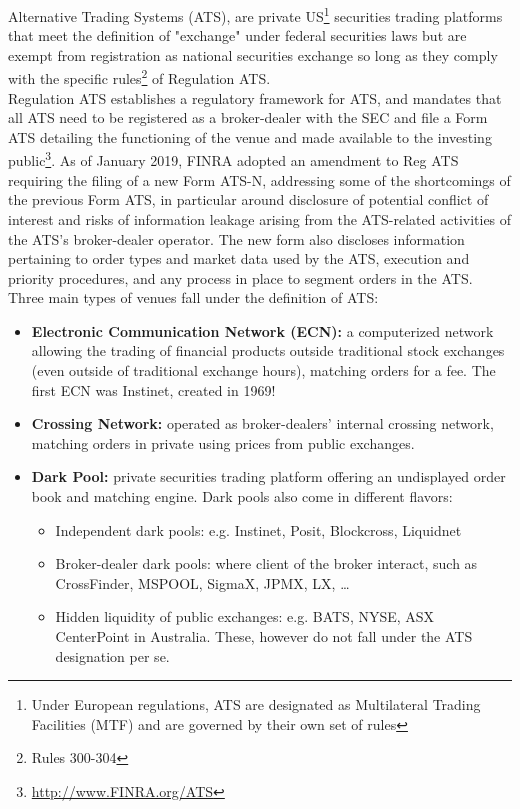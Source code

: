 Alternative Trading Systems (ATS), are private US\footnote{Under European regulations, ATS are designated as Multilateral Trading Facilities (MTF) and are governed by their own set of rules} securities trading platforms that meet the definition of "exchange" under federal securities laws but are exempt from registration as national securities exchange so long as they comply with the specific rules\footnote{Rules 300-304} of Regulation ATS. \\

Regulation ATS establishes a regulatory framework for ATS, and mandates that all ATS need to be registered as a broker-dealer with the SEC and file a Form ATS detailing the functioning of the venue and made available to the investing public\footnote{\url{http://www.FINRA.org/ATS}}. As of January 2019, FINRA adopted an amendment to Reg ATS requiring the filing of a new Form ATS-N, addressing some of the shortcomings of the previous Form ATS, in particular around disclosure of potential conflict of interest and risks of information leakage arising from the ATS-related activities of the ATS's broker-dealer operator. The new form also discloses information pertaining to order types and market data used by the ATS, execution and priority procedures, and any process in place to segment orders in the ATS.\\

Three main types of venues fall under the definition of ATS:
\begin{itemize}
\item{\textbf{Electronic Communication Network (ECN):}} a computerized network allowing the trading of financial products outside traditional stock exchanges (even outside of traditional exchange hours), matching orders for a fee. The first ECN was Instinet, created in 1969! 
\item{\textbf{Crossing Network:}} operated as broker-dealers' internal crossing network, matching orders in private using prices from public exchanges.
\item{\textbf{Dark Pool:}} private securities trading platform offering an undisplayed order book and matching engine. Dark pools also come in different flavors:
\begin{itemize}
\item{Independent dark pools:} e.g. Instinet, Posit, Blockcross, Liquidnet 
\item{Broker-dealer dark pools:} where client of the broker interact, such as  CrossFinder, MSPOOL, SigmaX, JPMX, LX, \dots
\item{Hidden liquidity of public exchanges:} e.g. BATS, NYSE, ASX CenterPoint in Australia. These, however do not fall under the ATS designation per se.
\end{itemize}
\end{itemize}

